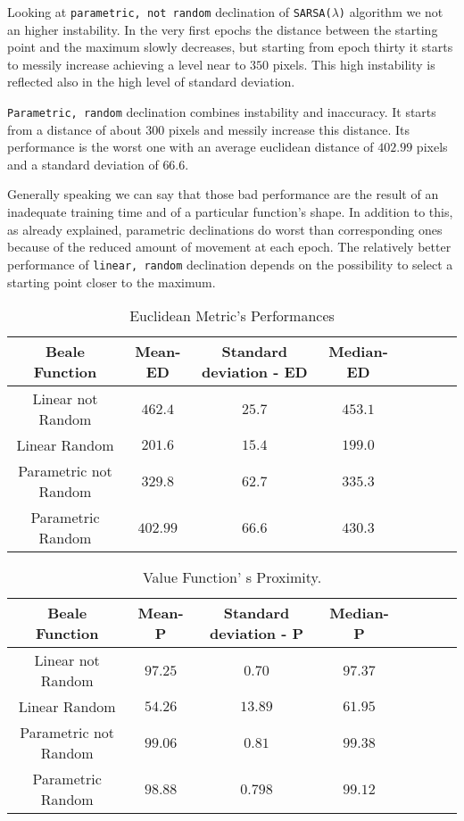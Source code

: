 Looking at {\tt parametric, not random} declination of  {\tt SARSA($\lambda$)} algorithm we not an higher instability. In the very first epochs the distance between the starting point and the maximum slowly decreases, but starting from epoch thirty it starts to messily increase achieving a level near to $350$ pixels. This high instability is reflected also in the high level of standard deviation.

{\tt Parametric, random} declination combines instability and inaccuracy. It starts from a distance of about $300$ pixels and messily increase this distance. Its performance is the worst one with an average euclidean distance of $402.99$ pixels and a standard deviation of $66.6$.

Generally speaking we can say that those bad performance are the result of an inadequate training time and of a particular function's shape. In addition to this, as already explained, parametric declinations do worst than corresponding ones because of the reduced amount of movement at each epoch. The relatively better performance of {\tt linear, random} declination depends on the possibility to select a starting point closer to the maximum. 

\begin{table}[h!]
\centering
\resizebox{\linewidth}{!} {
	\begin{tabular}{c| ccccccc} 
		\hline \textbf{Beale Function}
		& \textbf{Mean-ED} & \textbf{Standard deviation - ED}  &\textbf{Median-ED} \\ 
		\hline Linear not Random
		& $462.4$ & $25.7$ & $453.1$  \\ 
		\hline Linear Random
		& \cellcolor{red!25}$201.6$ & \cellcolor{red!25}$15.4$ & \cellcolor{red!25}$199.0$ \\ 
		\hline Parametric not Random
		& $329.8$ & $62.7$ & $335.3$ \\ 
		\hline Parametric Random
		& $402.99$ & $66.6$ & $430.3$ \\ 
		\hline 
	\end{tabular} 
}
\label{BealeTabEuclidean}
\caption{Euclidean Metric's Performances}
\end{table}

\begin{table}[h!]
	\centering
	\resizebox{\linewidth}{!} {
		\begin{tabular}{c| ccccccc} 
			\hline \textbf{Beale Function}
			& \textbf{Mean- P} & \textbf{Standard deviation - P}  &\textbf{Median- P} \\ 
			\hline Linear not Random
			& $97.25$ & \cellcolor{green!25}$0.70$ & $97.37$  \\ 
			\hline Linear Random
			& $54.26$ & $13.89$ & \cellcolor{green!25}$61.95$ \\ 
			\hline Parametric not Random
			& \cellcolor{green!25}$99.06$ & $0.81$ & $99.38$ \\ 
			\hline Parametric Random
			& $98.88$ & $0.798$ & $99.12$ \\ 
			\hline 
		\end{tabular} 
}
	\label{BealeTabProximity}
	\caption{Value Function' s Proximity.} 
\end{table}
